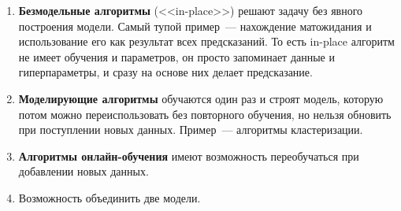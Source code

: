 \documentclass{article}
\begin{document}
    \begin{enumerate}
        \item \textbf{Безмодельные алгоритмы} (<<in-place>>) решают задачу без явного построения модели. Самый тупой пример~--- нахождение матожидания и использование его как результат всех предсказаний. То есть in-place алгоритм не имеет обучения и параметров, он просто запоминает данные и гиперпараметры, и сразу на основе них делает предсказание.
        \item \textbf{Моделирующие алгоритмы} обучаются один раз и строят модель, которую потом можно переиспользовать без повторного обучения, но нельзя обновить при поступлении новых данных. Пример~--- алгоритмы кластеризации.
        \item \textbf{Алгоритмы онлайн-обучения} имеют возможность переобучаться при добавлении новых данных.
        \item Возможность объединить две модели.
    \end{enumerate}
\end{document}
